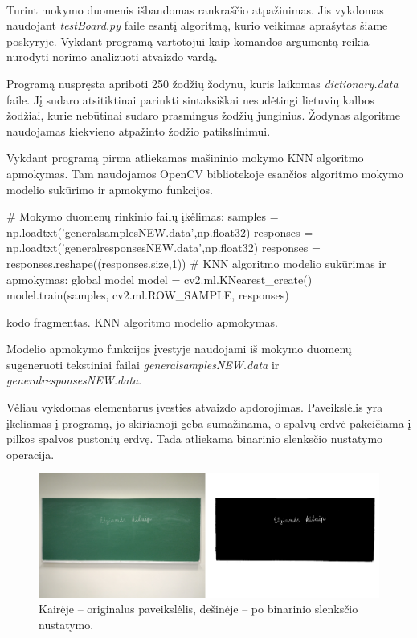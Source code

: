 \documentclass[a4paper,12pt]{article}
\begin{document}
 \paragraph{} Turint mokymo duomenis išbandomas rankraščio atpažinimas. Jis vykdomas naudojant \textit{testBoard.py} faile esantį algoritmą, kurio veikimas aprašytas šiame poskyryje. Vykdant programą vartotojui kaip komandos argumentą reikia nurodyti norimo analizuoti atvaizdo vardą.
 
 Programą nuspręsta apriboti 250 žodžių žodynu, kuris laikomas \textit{dictionary.data} faile. Jį sudaro atsitiktinai parinkti sintaksiškai nesudėtingi lietuvių kalbos žodžiai, kurie nebūtinai sudaro prasmingus žodžių junginius. Žodynas algoritme naudojamas kiekvieno atpažinto žodžio patikslinimui.
 
 Vykdant programą pirma atliekamas mašininio mokymo KNN algoritmo apmokymas. Tam naudojamos OpenCV bibliotekoje esančios algoritmo mokymo modelio sukūrimo ir apmokymo funkcijos.
 \begin{listing}[H]
 	\begin{pythoncode}
# Mokymo duomenų rinkinio failų įkėlimas:
samples = np.loadtxt('generalsamplesNEW.data',np.float32)
responses = np.loadtxt('generalresponsesNEW.data',np.float32)
responses = responses.reshape((responses.size,1))
# KNN algoritmo modelio sukūrimas ir apmokymas:
global model
model = cv2.ml.KNearest_create()
model.train(samples, cv2.ml.ROW_SAMPLE, responses)
 	\end{pythoncode}
 	\caption{kodo fragmentas. KNN algoritmo modelio apmokymas.}	
 \end{listing}
 
Modelio apmokymo funkcijos įvestyje naudojami iš mokymo duomenų sugeneruoti tekstiniai failai \textit{generalsamplesNEW.data} ir \textit{generalresponsesNEW.data}.

Vėliau vykdomas elementarus įvesties atvaizdo apdorojimas. Paveikslėlis yra įkeliamas į programą, jo skiriamoji geba sumažinama, o spalvų erdvė pakeičiama į pilkos spalvos pustonių erdvę. Tada atliekama binarinio slenksčio nustatymo operacija.
		\begin{figure}[H]
			\centering
			\includegraphics[scale=0.4]{images/binarythresh}
			\caption{Kairėje – originalus paveikslėlis, dešinėje – po binarinio slenksčio nustatymo.}   %
			\label{img:binarythresh}
		\end{figure}
\end{document}
